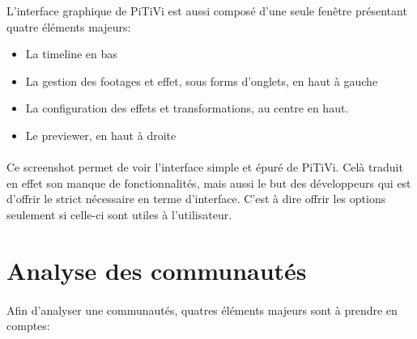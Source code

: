 L'interface graphique de PiTiVi est aussi composé d'une seule fenêtre
présentant quatre éléments majeurs:

\begin{itemize}

  \item {La timeline en bas}

  \item {La gestion des footages et effet, sous forms d'onglets, en haut
  à gauche}

  \item {La configuration des effets et transformations, au centre
  en haut.}

  \item {Le previewer, en haut à droite}

\end{itemize}

\paragraph{}

Ce screenshot permet de voir l'interface simple et épuré de
PiTiVi. Celà traduit en effet son manque de fonctionnalités, mais aussi
le but des développeurs qui est d'offrir le strict nécessaire en terme
d'interface. C'est à dire offrir les options seulement si celle-ci sont
utiles à l'utilisateur.

\newpage \section{Analyse des communautés}

\paragraph{}

Afin d'analyser une communautés, quatres éléments majeurs sont à
prendre en comptes:

